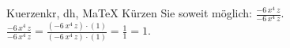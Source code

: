 \begin{MAufgabe}{Kuerzen}{kr, dh, MaTeX}
K\"urzen Sie soweit m\"oglich: $\frac{- 6\, x^4\, z}{- 6\, x^4\, z}$.\\ 
\ifLsg\MLoesung
\quad $\frac{- 6\, x^4\, z}{- 6\, x^4\, z}=\frac{(- 6\, x^4\, z)\cdot(1)}{(- 6\, x^4\, z)\cdot(1)}=\frac{1}{1}=1$.\else\relax\fi
 \end{MAufgabe}